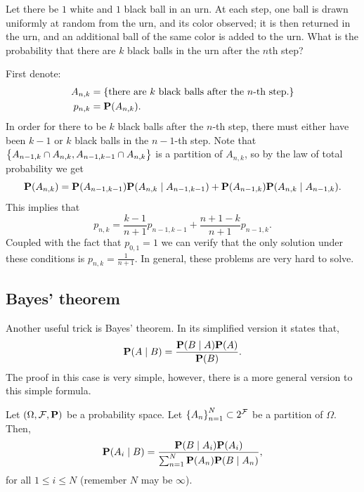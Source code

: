 \documentclass[11pt,a4paper]{article}
\begin{document}
\begin{exercise}
   Let there be $1$ white and $1$ black ball in an urn. 
   At each step, one ball is drawn uniformly at random from the urn, 
   and its color observed; 
   it is then returned in the urn, 
   and an additional ball of the same color is added to the urn.
   What is the probability that there are $k$ black balls in the urn after
   the $n$th step?
\end{exercise}
\begin{solution}
   First denote:
   \begin{align*}
     A_{n,k} &= \{\text{there are $k$ black balls after the $n$-th step.}\} \\
     p_{n,k} &= \mathbf{P}(A_{n,k}).
   \end{align*}
   In order for there to be $k$ black balls after the $n$-th step, there must
   either have been $k-1$ or $k$ black balls in the $n-1$-th step.
   Note that $\left\{A_{n-1,k} \cap A_{n,k},A_{n-1,k-1} \cap A_{n,k}\right\}$ is a partition
   of $A_{n,k}$, so by the law of total probability we get
   \[
     \mathbf{P}(A_{n,k}) = 
     \mathbf{P}(A_{n-1,k-1}) \mathbf{P}(A_{n,k} \mid A_{n-1,k-1}) + 
     \mathbf{P}(A_{n-1,k}) \mathbf{P}(A_{n,k} \mid A_{n-1,k}).
   \]
   This implies that
   \[ p_{n,k}=\frac{k-1}{n+1}p_{n-1,k-1}+\frac{n+1-k}{n+1}p_{n-1,k}. \]
   Coupled with the fact that $p_{0,1} = 1$ we can verify that the only
   solution under these conditions is $p_{n,k} = \frac{1}{n+1}$.
   In general, these problems are very hard to solve.
\end{solution}

\subsection{Bayes' theorem}
Another useful trick is Bayes' theorem.
In its simplified version it states that,
\[
  {\mathbf{P}}(A \mid B)={\frac{{\mathbf{P}}(B \mid A){\mathbf{P}}(A)}{{\mathbf{P}}(B)}}.
\]
The proof in this case is very simple, however, there is a more general
version to this simple formula.

\begin{theorem}
  Let $(\Omega, \mathcal F, \mathbf{P})$ be a probability space.
  Let $\left\{A_n\right\}_{n=1}^{N} \subset 2^{\mathcal F}$ be a partition of $\Omega$.
  Then,
  \[
    \mathbf{P}(A_i \mid B) = 
    {\frac{\mathbf{P}(B \mid A_{i})\mathbf{P}(A_{i})}
    {\sum_{n=1}^{N}\mathbf{P}(A_{n})\mathbf{P}(B \mid A_{n})}},
  \]
  for all $1 \le i \le N$ (remember $N$ may be $\infty$).
\end{theorem}
\end{document}

